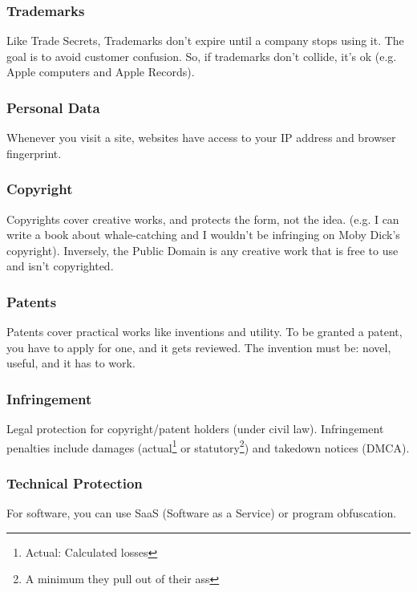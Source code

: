 \documentclass[13pt]{article}
\begin{document}
\subsubsection*{Trademarks}
Like Trade Secrets, Trademarks don't expire until a company stops using it. The goal is to avoid customer confusion. So, if trademarks don't collide, it's ok (e.g. Apple computers and Apple Records).

\subsubsection*{Personal Data}
Whenever you visit a site, websites have access to your IP address and browser fingerprint.

\subsubsection*{Copyright}
Copyrights cover creative works, and protects the form, not the idea. (e.g. I can write a book about whale-catching and I wouldn't be infringing on Moby Dick's copyright). Inversely, the Public Domain is any creative work that is free to use and isn't copyrighted.

\subsubsection*{Patents}
Patents cover practical works like inventions and utility. To be granted a patent, you have to apply for one, and it gets reviewed. The invention must be: novel, useful, and it has to work.

\subsubsection{Infringement}
Legal protection for copyright/patent holders (under civil law). Infringement penalties include damages (actual\footnote{Actual: Calculated losses} or statutory\footnote{A minimum they pull out of their ass}) and takedown notices (DMCA).

\subsubsection{Technical Protection}
For software, you can use SaaS (Software as a Service) or program obfuscation.
\end{document}
